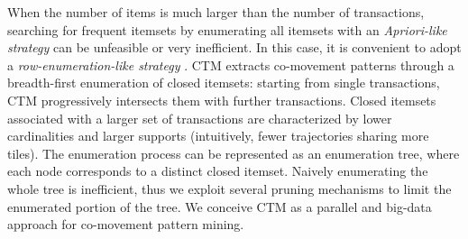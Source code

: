 \documentclass[
]{ceurart}
\newtheorem{theorem}{Theorem}
\newtheorem{example}{Example}
\newtheorem{definition}{Definition}
\begin{document}
When the number of items is much larger than the number of transactions, searching for frequent itemsets by enumerating all itemsets with an \textit{Apriori-like strategy} \citep{DBLP:conf/vldb/AgrawalS94} can be unfeasible or very inefficient.
In this case, it is convenient to adopt a \textit{row-enumeration-like strategy} \citep{DBLP:conf/kdd/PanCTYZ03}. %
%
%
CTM extracts co-movement patterns through a breadth-first enumeration of 
closed itemsets: starting from single transactions, CTM progressively intersects them with further transactions.
Closed itemsets associated with a larger set of transactions are characterized by lower cardinalities and larger supports (intuitively, fewer trajectories sharing more tiles).
The enumeration process can be represented as an enumeration tree, where each node 
corresponds to a distinct closed itemset.
Naively enumerating the whole tree is inefficient, thus we exploit several pruning mechanisms to limit the enumerated portion of the tree.
We conceive CTM as a parallel and big-data approach for co-movement pattern mining.
\end{document}
